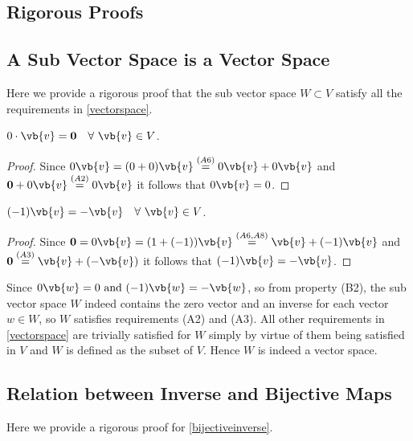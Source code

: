 \documentclass[a4paper,12pt]{report}
\begin{document}
\begin{appendices}
\chapter{Rigorous Proofs}

\section{A Sub Vector Space is a Vector Space} \label{subvectorvector} 

Here we provide a rigorous proof that the sub vector space \(W \subset V\) satisfy all the requirements in \cref{vectorspace}.
\begin{lemma}
    \(0 \cdot \vb{v} = \boldsymbol{0} ~~~ \forall ~ \vb{v} \in V\).  
\end{lemma}
    
\begin{proof}
    Since \(0\vb{v} = (0+0)\vb{v} \stackrel{(A6)}{=} 0\vb{v} + 0\vb{v} \) and \(\boldsymbol{0} + 0\vb{v} \stackrel{(A2)}{=}  0\vb{v}  \) it follows that \(0\vb{v} =0\).  
\end{proof}
    
\begin{lemma} 
        \((-1)\vb{v} = -\vb{v} ~~~ \forall ~\vb{v} \in V\). 
\end{lemma}
        
\begin{proof}
        Since \(\boldsymbol{0} = 0\vb{v} = (1+(-1))\vb{v} \stackrel{(A6,A8)}{=} \vb{v} + (-1)\vb{v} \) and \(\boldsymbol{0} \stackrel{(A3)}{=} \vb{v} +(-\vb{v} ) \) it follows that \((-1)\vb{v} =-\vb{v} \).  
\end{proof}

Since \(0\vb{w} =0 \text { and } (-1)\vb{w} =-\vb{w} \), so from property (B2), the sub vector space \(W\) indeed contains the zero vector and an inverse for each vector \(w \in  W\), so \(W\) satisfies requirements (A2) and (A3). All other requirements in \cref{vectorspace} are trivially satisfied for \(W\) simply by virtue of them being satisfied in \(V\) and \(W\) is defined as the subset of \(V\). Hence \(W\) is indeed a vector space.    

\section{Relation between Inverse and Bijective Maps} \label{bijectiveinverseapp} 

Here we provide a rigorous proof for \cref{bijectiveinverse}.


\end{appendices}
\end{document}
